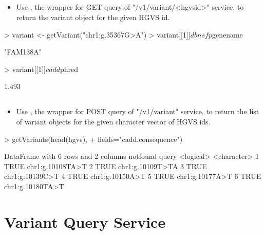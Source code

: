 \documentclass[12pt]{article}
\begin{document}
\subsection{}

\begin{itemize}
\item Use , the wrapper for GET query of "/v1/variant/<hgvsid>" service, to return the variant object for the given HGVS id.
\end{itemize} 


\begin{Schunk}
\begin{Sinput}
> variant <- getVariant("chr1:g.35367G>A")
> variant[[1]]$dbnsfp$genename
\end{Sinput}
\begin{Soutput}
[1] "FAM138A"
\end{Soutput}
\begin{Sinput}
> variant[[1]]$cadd$phred
\end{Sinput}
\begin{Soutput}
[1] 1.493
\end{Soutput}
\end{Schunk}

\subsection{}

\begin{itemize}
\item Use , the wrapper for POST query of "/v1/variant" service, to return the list of variant objects for the given character vector of HGVS ids.
\end{itemize} 


\begin{Schunk}
\begin{Sinput}
> getVariants(head(hgvs),
+             fields="cadd.consequence")
\end{Sinput}
\begin{Soutput}
DataFrame with 6 rows and 2 columns
   notfound            query
  <logical>      <character>
1      TRUE chr1:g.10108TA>T
2      TRUE chr1:g.10109T>TA
3      TRUE  chr1:g.10139C>T
4      TRUE  chr1:g.10150A>T
5      TRUE  chr1:g.10177A>T
6      TRUE chr1:g.10180TA>T
\end{Soutput}
\end{Schunk}


\section{Variant Query Service}
\end{document}
